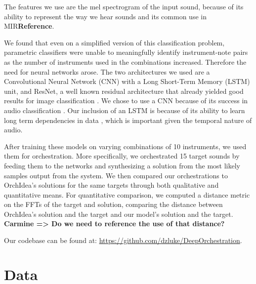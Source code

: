 \documentclass{article}
\newcommand{\carmine}[1]{\textbf{\color{red} Carmine => #1}}
\begin{document}

The features we use are the mel spectrogram of the input sound, because of its ability to represent the way we hear sounds and its common use in MIR\textbf{Reference}.

We found that even on a simplified version of this classification problem, parametric classifiers were unable to meaningfully identify instrument-note pairs as the number of instruments used in the combinations increased. Therefore the need for neural networks arose. The two architectures we used are a Convolutional Neural Network (CNN) with a Long Short-Term Memory (LSTM) unit, and ResNet, a well known residual architecture that already yielded good results for image classification \cite{He15}. We chose to use a CNN because of its success in audio classification \cite{Hershey16}. Our inclusion of an LSTM is because of its ability to learn long term dependencies in data \cite{Hochreiter97}, which is important given the temporal nature of audio.

After training these models on varying combinations of 10 instruments, we used them for orchestration. More specifically, we orchestrated 15 target sounds by feeding them to the networks and synthesizing a solution from the most likely samples output from the system. We then compared our orchestrations to OrchIdea's solutions for the same targets through both qualitative and quantitative means. For quantitative comparison, we computed a distance metric on the FFTs of the target and solution, comparing the distance between OrchIdea's solution and the target and our model's solution and the target. \carmine{Do we need to reference the use of that distance?}

Our codebase can be found at: \url{https://github.com/dzluke/DeepOrchestration}.
\section{Data}
\end{document}
